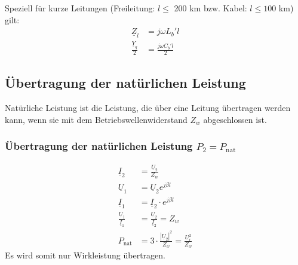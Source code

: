 \documentclass[a4paper,twocolumn,10pt]{article}
\begin{document}
Speziell für kurze Leitungen (Freileitung: $l\leq$ 200 km bzw. Kabel: $l\leq 100$ km) gilt:
\begin{equation*}
\begin{split}
\underline{Z}_l&=j\omega L_b'l\\
\frac{\underline{Y}_q}{2}&=\frac{j\omega C_b'l}{2}
\end{split}
\end{equation*}

\subsection{Übertragung der natürlichen Leistung}
Natürliche Leistung ist die Leistung, die über eine Leitung übertragen werden kann, wenn sie mit dem Betriebswellenwiderstand $Z_w$ abgeschlossen ist.

\subsubsection{Übertragung der natürlichen Leistung $P_2=P_{\text{nat}}$}
\begin{equation*}
\begin{split}
\underline{I}_2&=\frac{\underline{U}_2}{Z_w}\\
\underline{U}_1&=\underline{U}_2e^{j\beta l}\\
\underline{I}_1&=\underline{I}_2\cdot e^{j\beta l}\\
\frac{\underline{U}_1}{\underline{I}_1}&=\frac{\underline{U}_2}{\underline{I}_2}=Z_w\\
P_{\text{nat}}&=3\cdot\frac{|\underline{U}_2|^2}{Z_w}=\frac{U_r^2}{Z_w}
\end{split}
\end{equation*}
Es wird somit nur Wirkleistung übertragen.
\end{document}
